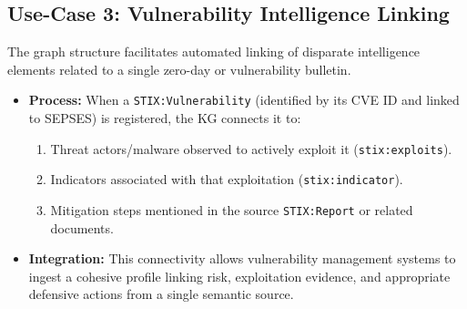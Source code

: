 \subsection{Use-Case 3: Vulnerability Intelligence Linking}
The graph structure facilitates automated linking of disparate intelligence elements related to a single zero-day or vulnerability bulletin.

\begin{itemize}
    \item \textbf{Process:} When a \texttt{STIX:Vulnerability} (identified by its CVE ID and linked to SEPSES) is registered, the KG connects it to:
    \begin{enumerate}
        \item Threat actors/malware observed to actively exploit it (\texttt{stix:exploits}).
        \item Indicators associated with that exploitation (\texttt{stix:indicator}).
        \item Mitigation steps mentioned in the source \texttt{STIX:Report} or related documents.
    \end{enumerate}
    \item \textbf{Integration:} This connectivity allows vulnerability management systems to ingest a cohesive profile linking risk, exploitation evidence, and appropriate defensive actions from a single semantic source.
\end{itemize}